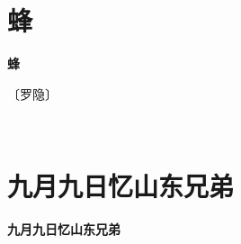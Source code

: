 \documentclass[12pt,UTF-8,openany,fontset=none]{ctexbook}
\begin{document}
\vspace{8pt}
\clearpage

\section{蜂}



\begin{center}
    {\bfseries 蜂}
\end{center}

\begin{center}
    \vspace{10pt}
    
    \begin{large}
        
        〔罗隐〕
        
    \end{large}
    
    \vspace{8pt}
    
    \begin{huge}
        
        \phantom{。}

        \phantom{。}
        
        \phantom{。}

        \phantom{...}~~  \!\! {}
        
    \end{huge}
    
\end{center}

\vspace{8pt}
\clearpage

\section{九月九日忆山东兄弟}



\begin{center}
    {\bfseries 九月九日忆山东兄弟}
\end{center}
\end{document}
